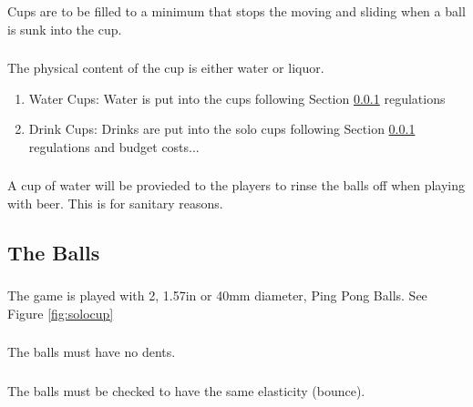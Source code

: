         \subsubsection{}\label{sssec:CC,filling}
            Cups are to be filled to a minimum that stops the moving and sliding when a ball is sunk into the cup.
        \subsubsection{} \label{sssec:CC,w_vs_l}
            The physical content of the cup is either water or liquor.
            \begin{enumerate}[label=(\alph*), leftmargin=2cm]
                \itemsep -1.25em 
                \item Water Cups: Water is put into the cups following Section \ref{sssec:CC,filling} regulations \\
                \item Drink Cups: Drinks are put into the solo cups following Section \ref{sssec:CC,filling} regulations and budget costs...
            \end{enumerate}
        \subsubsection{} \label{sssec:CC,rinse}
            A cup of water will be provieded to the players to rinse the balls off when playing with beer. This is for sanitary reasons.

    \subsection{The Balls}\label{ssec:Balls}
        \subsubsection{} \label{sssec:Balls,num}
            The game is played with 2, 1.57in or 40mm diameter, Ping Pong Balls. See Figure \ref{fig:solocup}
        \subsubsection{} \label{sssec:Balls,dents}
            The balls must have no dents.
        \subsubsection{}\label{sssec:Balls,bounce}
            The balls must be checked to have the same elasticity (bounce). 
